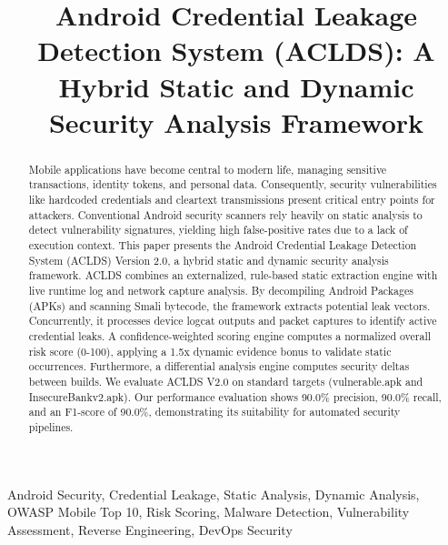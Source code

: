 \documentclass[conference]{
IEEEtran}
\begin{document}
\title{Android Credential Leakage Detection System (ACLDS): A Hybrid Static and Dynamic Security Analysis Framework}

\author{
}

\maketitle

\begin{abstract}
Mobile applications have become central to modern life, managing sensitive transactions, identity tokens, and personal data. Consequently, security vulnerabilities like hardcoded credentials and cleartext transmissions present critical entry points for attackers. Conventional Android security scanners rely heavily on static analysis to detect vulnerability signatures, yielding high false-positive rates due to a lack of execution context. This paper presents the Android Credential Leakage Detection System (ACLDS) Version 2.0, a hybrid static and dynamic security analysis framework. ACLDS combines an externalized, rule-based static extraction engine with live runtime log and network capture analysis. By decompiling Android Packages (APKs) and scanning Smali bytecode, the framework extracts potential leak vectors. Concurrently, it processes device logcat outputs and packet captures to identify active credential leaks. A confidence-weighted scoring engine computes a normalized overall risk score (0-100), applying a 1.5x dynamic evidence bonus to validate static occurrences. Furthermore, a differential analysis engine computes security deltas between builds. We evaluate ACLDS V2.0 on standard targets (vulnerable.apk and InsecureBankv2.apk). Our performance evaluation shows 90.0\% precision, 90.0\% recall, and an F1-score of 90.0\%, demonstrating its suitability for automated security pipelines.
\end{abstract}

\begin{IEEEkeywords}
Android Security, Credential Leakage, Static Analysis, Dynamic Analysis, OWASP Mobile Top 10, Risk Scoring, Malware Detection, Vulnerability Assessment, Reverse Engineering, DevOps Security
\end{IEEEkeywords}
\end{document}
